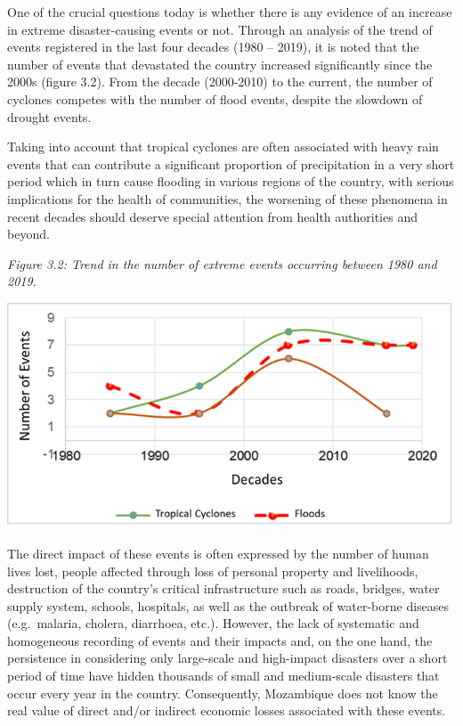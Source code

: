 \documentclass[
]{book}
\begin{document}
One of the crucial questions today is whether there is any evidence of an increase in extreme disaster-causing events or not. Through an analysis of the trend of events registered in the last four decades (1980 -- 2019), it is noted that the number of events that devastated the country increased significantly since the 2000s (figure 3.2). From the decade (2000-2010) to the current, the number of cyclones competes with the number of flood events, despite the slowdown of drought events.

Taking into account that tropical cyclones are often associated with heavy rain events that can contribute a significant proportion of precipitation in a very short period which in turn cause flooding in various regions of the country, with serious implications for the health of communities, the worsening of these phenomena in recent decades should deserve special attention from health authorities and beyond.

\emph{Figure 3.2: Trend in the number of extreme events occurring between 1980 and 2019.}

\includegraphics{Figure23.png}

The direct impact of these events is often expressed by the number of human lives lost, people affected through loss of personal property and livelihoods, destruction of the country's critical infrastructure such as roads, bridges, water supply system, schools, hospitals, as well as the outbreak of water-borne diseases (e.g.~malaria, cholera, diarrhoea, etc.). However, the lack of systematic and homogeneous recording of events and their impacts and, on the one hand, the persistence in considering only large-scale and high-impact disasters over a short period of time have hidden thousands of small and medium-scale disasters that occur every year in the country. Consequently, Mozambique does not know the real value of direct and/or indirect economic losses associated with these events.
\end{document}
